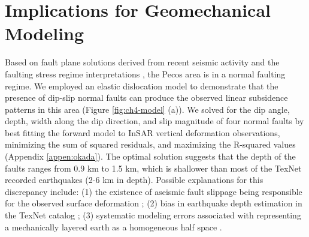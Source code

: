 \section{Implications for Geomechanical Modeling}
Based on fault plane solutions derived from recent seismic activity and the faulting stress regime interpretations \citep{LundSnee2018StateStressPermian}, the Pecos area is in a normal faulting regime. We employed an elastic dislocation model \citep{Okada1992InternalDeformationDue} to demonstrate that the presence of dip-slip normal faults can produce the observed linear subsidence patterns in this area (Figure \ref{fig:ch4-model} (a)). We solved for the dip angle, depth, width along the dip direction, and slip magnitude of four normal faults by best fitting the forward model to InSAR vertical deformation observations, minimizing the sum of squared residuals, and maximizing the R-squared values \citep{Du1992ComparisonVariousInversion} (Appendix \ref{appen:okada}). The optimal solution suggests that the depth of the faults ranges from 0.9 km to 1.5 km, which is shallower than most of the TexNet recorded earthquakes (2-6 km in depth). Possible explanations for this discrepancy include: (1) the existence of aseismic fault slippage being responsible for the observed surface deformation \citep{McGarr2017WastewaterDisposalEarthquake}; (2) bias in earthquake depth estimation in the TexNet catalog \citep{Lomax2019ImprovingAbsoluteEarthquake}; (3) systematic modeling errors associated with representing a mechanically layered earth as a homogeneous half space \citep{Du1992ComparisonVariousInversion}. 



